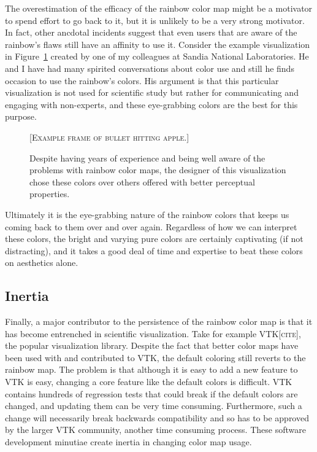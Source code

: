 \documentclass[letterpaper,twocolumn,fleqn]{article}
\newcommand{\fix}[1]{{\color{red}\textsc{[#1]}}}
\begin{document}
The overestimation of the efficacy of the rainbow color map might be a
motivator to spend effort to go back to it, but it is unlikely to be a very
strong motivator. In fact, other ancdotal incidents suggest that even users
that are aware of the rainbow's flaws still have an affinity to use it.
Consider the example visualization in Figure~\ref{fig:ExpertRainbowVis}
created by one of my colleagues at Sandia National Laboratories. He and I
have had many spirited conversations about color use and still he finds
occasion to use the rainbow's colors. His argument is that this particular
visualization is not used for scientific study but rather for communicating
and engaging with non-experts, and these eye-grabbing colors are the best
for this purpose.

\begin{figure}[htb]
  \centering
  \fix{Example frame of bullet hitting apple.}
  \caption{Despite having years of experience and being well aware of the
    problems with rainbow color maps, the designer of this visualization
    chose these colors over others offered with better perceptual
    properties.}
  \label{fig:ExpertRainbowVis}
\end{figure}

Ultimately it is the eye-grabbing nature of the rainbow colors that keeps
us coming back to them over and over again. Regardless of how we can
interpret these colors, the bright and varying pure colors are certainly
captivating (if not distracting), and it takes a good deal of time and
expertise to beat these colors on aesthetics alone.

\subsection{Inertia}

\noindent
Finally, a major contributor to the persistence of the rainbow color map is
that it has become entrenched in scientific visualization. Take for example
VTK\fix{cite}, the popular visualization library. Despite the fact that
better color maps have been used with and contributed to VTK, the default
coloring still reverts to the rainbow map. The problem is that although it
is easy to add a new feature to VTK is easy, changing a core feature like
the default colors is difficult. VTK contains hundreds of regression tests
that could break if the default colors are changed, and updating them can
be very time consuming. Furthermore, such a change will necessarily break
backwards compatibility and so has to be approved by the larger VTK
community, another time consuming process. These software development
minutiae create inertia in changing color map usage.
\end{document}
